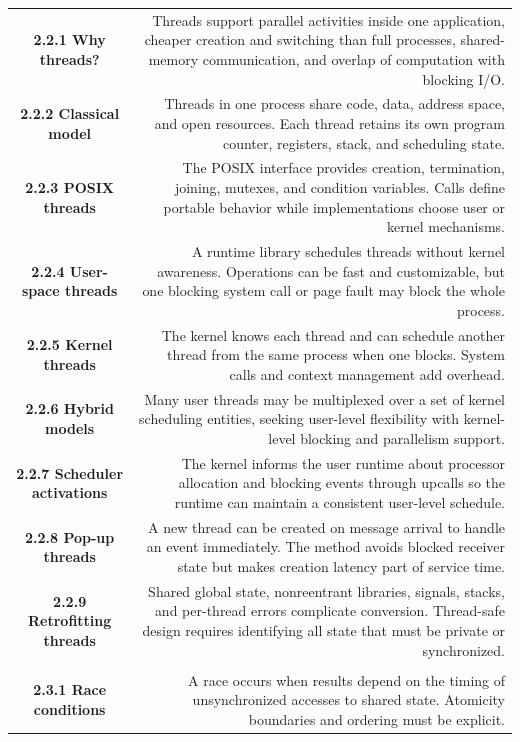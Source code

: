 \documentclass[10pt,letterpaper]{article}
\begin{document}
\begin{longtable}{C N}
\\*\hline
\textbf{2.2.1 Why threads?} & Threads support parallel activities inside one application, cheaper creation and switching than full processes, shared-memory communication, and overlap of computation with blocking I/O.\\\hline
\textbf{2.2.2 Classical model} & Threads in one process share code, data, address space, and open resources. Each thread retains its own program counter, registers, stack, and scheduling state.\\\hline
\textbf{2.2.3 POSIX threads} & The POSIX interface provides creation, termination, joining, mutexes, and condition variables. Calls define portable behavior while implementations choose user or kernel mechanisms.\\\hline
\textbf{2.2.4 User-space threads} & A runtime library schedules threads without kernel awareness. Operations can be fast and customizable, but one blocking system call or page fault may block the whole process.\\\hline
\textbf{2.2.5 Kernel threads} & The kernel knows each thread and can schedule another thread from the same process when one blocks. System calls and context management add overhead.\\\hline
\textbf{2.2.6 Hybrid models} & Many user threads may be multiplexed over a set of kernel scheduling entities, seeking user-level flexibility with kernel-level blocking and parallelism support.\\\hline
\textbf{2.2.7 Scheduler activations} & The kernel informs the user runtime about processor allocation and blocking events through upcalls so the runtime can maintain a consistent user-level schedule.\\\hline
\textbf{2.2.8 Pop-up threads} & A new thread can be created on message arrival to handle an event immediately. The method avoids blocked receiver state but makes creation latency part of service time.\\\hline
\textbf{2.2.9 Retrofitting threads} & Shared global state, nonreentrant libraries, signals, stacks, and per-thread errors complicate conversion. Thread-safe design requires identifying all state that must be private or synchronized.\\\hline
{}\\*\hline
\textbf{2.3.1 Race conditions} & A race occurs when results depend on the timing of unsynchronized accesses to shared state. Atomicity boundaries and ordering must be explicit.\\\hline

\end{longtable}
\end{document}
